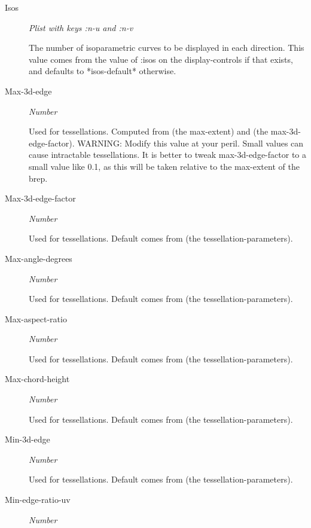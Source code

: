 \documentclass [11pt]{book}
\begin{document}
\begin{itemize}
\begin{description}
\item [Isos]
\emph{Plist with keys :n-u and :n-v}

 The number of isoparametric curves to be displayed in each direction.
This value comes from the value of :isos on the display-controls if that exists, and defaults
to *isos-default* otherwise.




\item [Max-3d-edge]
\emph{Number}

 Used for tessellations. Computed from (the max-extent) and (the max-3d-edge-factor).
WARNING: Modify this value at your peril. Small values can cause intractable tessellations.
It is better to tweak max-3d-edge-factor to a small value like 0.1, as this will
be taken relative to the max-extent of the brep.




\item [Max-3d-edge-factor]
\emph{Number}

 Used for tessellations. Default comes from (the tessellation-parameters).




\item [Max-angle-degrees]
\emph{Number}

 Used for tessellations. Default comes from (the tessellation-parameters).




\item [Max-aspect-ratio]
\emph{Number}

 Used for tessellations. Default comes from (the tessellation-parameters).




\item [Max-chord-height]
\emph{Number}

 Used for tessellations. Default comes from (the tessellation-parameters).




\item [Min-3d-edge]
\emph{Number}

 Used for tessellations. Default comes from (the tessellation-parameters).




\item [Min-edge-ratio-uv]
\emph{Number}


\end{description}
\end{itemize}
\end{document}
